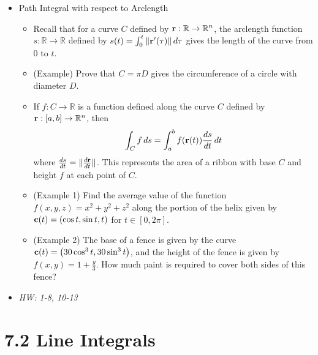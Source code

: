 \documentclass[11pt]{article}
\begin{document}
\begin{itemize}
  \item Path Integral with respect to Arclength
    \begin{itemize}
      \item Recall that for a curve \(C\) defined by
            \(\mathbf{r}:\mathbb R\to\mathbb R^n\), the arclength function
            \(s:\mathbb R\to\mathbb R\) defined by
            \(s(t)=\int_0^t\|\mathbf{r}'(\tau)\|\,d\tau\) gives the length
            of the curve from \(0\) to \(t\).
      \item (Example) Prove that \(C=\pi D\) gives the circumference of
            a circle with diameter \(D\).
      \item If \(f:C\to\mathbb R\) is a function defined
            along the curve \(C\) defined by \(\mathbf{r}:[a,b]\to\mathbb R^n\),
            then
            \[
              \int_C f\,d s
                =
              \int_a^b f(\mathbf{r}(t))\frac{ds}{dt}\,d t
            \]
            where \(\frac{ds}{dt}=\|\frac{d\mathbf{r}}{dt}\|\).
            This represents the area of a ribbon with base \(C\) and
            height \(f\) at each point of \(C\).
      \item (Example 1) Find the average value of the function
            \(f(x,y,z)=x^2+y^2+z^2\) along the portion of the helix given by
            \(\mathbf{c}(t)=\left(\cos t,\sin t,t\right)\) for \(t\in[0,2\pi]\).
      \item (Example 2) The base of a fence is given by the curve
            \(\mathbf{c}(t)=\left(30\cos^3t,30\sin^3t\right)\), and the height of the
            fence is given by \(f(x,y)=1+\frac{y}{3}\). How much paint is
            required to cover both sides of this fence?
    \end{itemize}
  \item\textit{
    HW: 1-8, 10-13
  }
\end{itemize}



\section*{7.2 Line Integrals}
\end{document}
